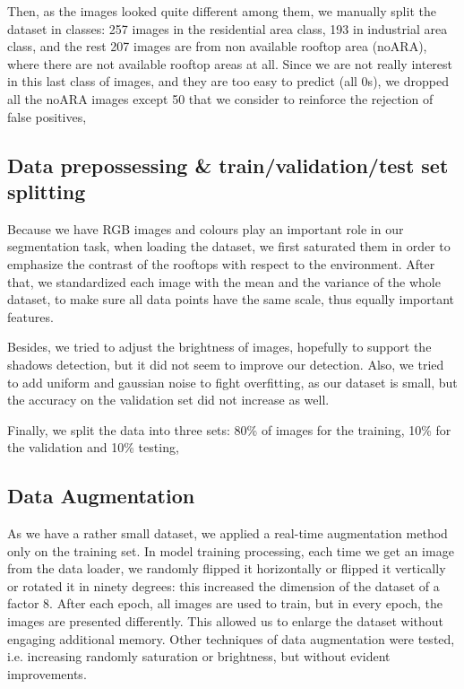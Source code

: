 \documentclass[9pt,conference,compsocconf]{IEEEtran}
\begin{document}
Then, as the images looked quite different among them, we manually split the dataset in classes: 257 images in the residential area class, 193 in industrial area class, and the rest 207 images are from non available rooftop area (noARA), where there are not available rooftop areas at all. Since we are not really interest in this last class of images, and they are too easy to predict (all 0s), we dropped all the noARA images except 50 that we consider to reinforce the rejection of false positives,


\subsection{Data prepossessing \& train/validation/test set splitting }
\label{subsec:dataPrepossessing }
Because we have RGB images and colours play an important role in our segmentation task, when loading the dataset, we first saturated them in order to emphasize the contrast of the rooftops with respect to the environment.  After that, we standardized each image with the mean and the variance of the whole dataset, to make sure all data points have the same scale, thus equally important features.

Besides, we tried to adjust the brightness of images, hopefully to support the shadows detection, but it did not seem to improve our detection. Also, we tried to add uniform and gaussian noise to fight overfitting, as our dataset is small, but the accuracy on the validation set did not increase as well.

Finally, we split the data into three sets: 80\% of images for the training, 10\% for the validation and 10\% testing,

\subsection{Data Augmentation}
\label{subsec:dataPAugmentation}
As we have a rather small dataset, we applied a real-time augmentation method only on the training set. 
In model training processing, each time we get an image from the data loader, we randomly flipped it horizontally or flipped it vertically or rotated it in ninety degrees: this increased the dimension of the dataset of a factor 8. After each epoch, all images are used to train, but in every epoch, the images are presented differently. This allowed us to enlarge the dataset without engaging additional memory.
Other techniques of data augmentation were tested, i.e. increasing randomly saturation or brightness, but without evident improvements.
\end{document}
